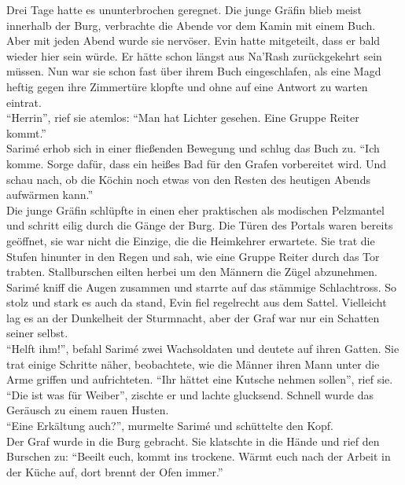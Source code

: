 Drei Tage hatte es ununterbrochen geregnet. Die junge Gräfin blieb meist innerhalb der Burg, 
verbrachte die Abende vor dem Kamin mit einem Buch. Aber mit jeden Abend wurde sie nervöser. Evin 
hatte mitgeteilt, dass er bald wieder hier sein würde. Er hätte schon längst aus Na'Rash 
zurückgekehrt sein müssen. Nun war sie schon fast über ihrem Buch eingeschlafen, als eine Magd 
heftig gegen ihre Zimmertüre klopfte und ohne auf eine Antwort zu warten eintrat. \\
``Herrin'', rief sie atemlos: ``Man hat Lichter gesehen. Eine Gruppe Reiter kommt.''\\
Sarimé erhob sich in einer fließenden Bewegung und schlug das Buch zu. ``Ich komme. Sorge dafür, 
dass 
ein heißes Bad für den Grafen vorbereitet wird. Und schau nach, ob die Köchin noch etwas von den 
Resten des heutigen Abends aufwärmen kann.''\\
Die junge Gräfin schlüpfte in einen eher praktischen als modischen Pelzmantel und schritt eilig 
durch die Gänge der Burg. Die Türen des Portals waren bereits geöffnet, sie war nicht die Einzige, 
die die Heimkehrer erwartete. Sie trat die Stufen hinunter in den Regen und sah, wie eine Gruppe 
Reiter durch das Tor trabten. Stallburschen eilten herbei um den Männern die Zügel abzunehmen. 
Sarimé kniff die Augen zusammen und starrte auf das stämmige Schlachtross. So stolz und stark es 
auch da stand, Evin fiel regelrecht aus dem Sattel. Vielleicht lag es an der Dunkelheit der 
Sturmnacht, aber der Graf war nur ein Schatten seiner selbst.\\
``Helft ihm!'', befahl Sarimé zwei Wachsoldaten und deutete auf ihren Gatten. Sie trat einige 
Schritte 
näher, beobachtete, wie die Männer ihren Mann unter die Arme griffen und aufrichteten. ``Ihr 
hättet eine Kutsche nehmen sollen'', rief sie.\\
``Die ist was für Weiber'', zischte er und lachte glucksend. Schnell wurde das Geräusch zu einem 
rauen 
Husten.\\
``Eine Erkältung auch?'', murmelte Sarimé und schüttelte den Kopf.\\
Der Graf wurde in die Burg gebracht. Sie klatschte in die Hände und rief den Burschen zu: ``Beeilt 
euch, kommt ins trockene. Wärmt euch nach der Arbeit in der Küche auf, dort brennt der Ofen 
immer.''\\

